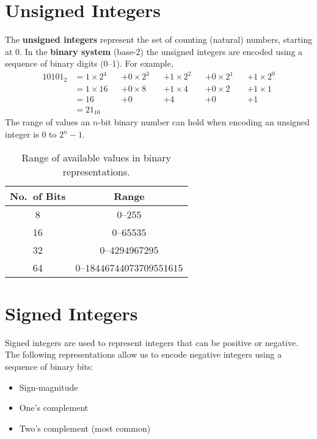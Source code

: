 \documentclass[a4paper]{report}
\begin{document}
\section{Unsigned Integers}
The \textbf{unsigned integers} represent the set of counting (natural)
numbers, starting at 0. In the \textbf{binary system} (base-2) the
unsigned integers are encoded using a sequence of binary digits (0--1).
For example,
\begin{align*}
    10101_2 & = 1 \times 2^4 &  & + 0 \times 2^3 &  & + 1 \times 2^2 &  & + 0 \times 2^1 &  & + 1 \times 2^0 \\
            & = 1 \times 16  &  & + 0 \times 8   &  & + 1 \times 4   &  & + 0 \times 2   &  & + 1 \times 1   \\
            & = 16           &  & + 0            &  & + 4            &  & + 0            &  & + 1            \\
            & = 21_{10}
\end{align*}
The range of values an \(n\)-bit binary number can hold when encoding an unsigned integer is 0 to \(2^n - 1\).
\begin{table}[H]
    \centering
    \begin{tabular}{c c}
        \toprule
        \textbf{No.\ of Bits} & \textbf{Range}                        \\
        \midrule
        8                     & \(0\)--\(255\)                        \\
        16                    & \(0\)--\(\num{65535}\)                \\
        32                    & \(0\)--\(\num{4294967295}\)           \\
        64                    & \(0\)--\(\num{18446744073709551615}\) \\
        \bottomrule
    \end{tabular}
    \caption{Range of available values in binary representations.} %
\end{table}
\section{Signed Integers}
Signed integers are used to represent integers that can be positive or
negative. The following representations allow us to encode negative
integers using a sequence of binary bits:
\begin{itemize}
    \item Sign-magnitude
    \item One's complement
    \item Two's complement (most common)
\end{itemize}
\end{document}
